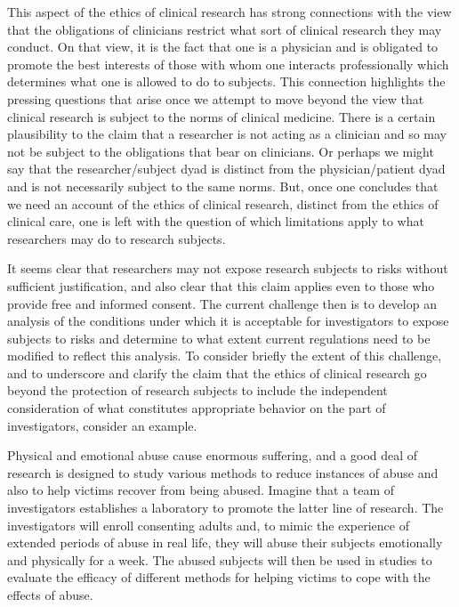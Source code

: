 \documentclass[12p]{article}
\begin{document}
This aspect of the ethics of clinical research has strong connections with the view that the obligations of clinicians restrict what sort of clinical research they may conduct. On that view, it is the fact that one is a physician and is obligated to promote the best interests of those with whom one interacts professionally which determines what one is allowed to do to subjects. This connection highlights the pressing questions that arise once we attempt to move beyond the view that clinical research is subject to the norms of clinical medicine. There is a certain plausibility to the claim that a researcher is not acting as a clinician and so may not be subject to the obligations that bear on clinicians. Or perhaps we might say that the researcher/subject dyad is distinct from the physician/patient dyad and is not necessarily subject to the same norms. But, once one concludes that we need an account of the ethics of clinical research, distinct from the ethics of clinical care, one is left with the question of which limitations apply to what researchers may do to research subjects.

It seems clear that researchers may not expose research subjects to risks without sufficient justification, and also clear that this claim applies even to those who provide free and informed consent. The current challenge then is to develop an analysis of the conditions under which it is acceptable for investigators to expose subjects to risks and determine to what extent current regulations need to be modified to reflect this analysis. To consider briefly the extent of this challenge, and to underscore and clarify the claim that the ethics of clinical research go beyond the protection of research subjects to include the independent consideration of what constitutes appropriate behavior on the part of investigators, consider an example.

Physical and emotional abuse cause enormous suffering, and a good deal of research is designed to study various methods to reduce instances of abuse and also to help victims recover from being abused. Imagine that a team of investigators establishes a laboratory to promote the latter line of research. The investigators will enroll consenting adults and, to mimic the experience of extended periods of abuse in real life, they will abuse their subjects emotionally and physically for a week. The abused subjects will then be used in studies to evaluate the efficacy of different methods for helping victims to cope with the effects of abuse.
\end{document}
